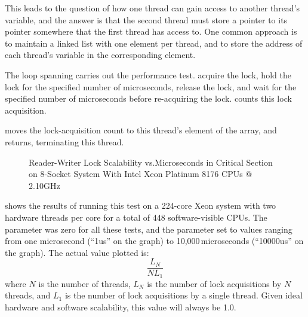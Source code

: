 {{	This leads to the question of how one thread can gain access to
	another thread's  variable, and the answer is that
	the second thread must store a pointer to its 
	pointer somewhere that the first thread has access to.
	One common approach is to maintain a linked list with one
	element per thread, and to store the address of each thread's
	 variable in the corresponding element.
}\QuickQuizEndE
}

\begin{fcvref}
The loop spanning  carries out the performance test.
 acquire the lock,
 hold the lock for the specified
number of microseconds,
 release the lock,
and  wait for the specified
number of microseconds before re-acquiring the lock.
 counts this lock acquisition.

 moves the lock-acquisition count to this thread's element of the
 array, and  returns, terminating this thread.
\end{fcvref}

\begin{figure}
\centering
{}
\caption{Reader-Writer Lock Scalability vs.\@ Microseconds in Critical Section on 8-Socket System With Intel Xeon Platinum 8176 CPUs @ 2.10GHz}
\label{fig:toolsoftrade:Reader-Writer Lock Scalability vs. Microseconds in Critical Section}
\end{figure}

shows the results of running this test on a 224-core Xeon system
with two hardware threads per core for a total of 448 software-visible
CPUs.
The  parameter was zero for all these tests, and the
 parameter set to values ranging from one microsecond (``1us''
on the graph) to 10,000\,microseconds (``10000us'' on the graph).
The actual value plotted is:
\begin{equation}
	\frac{L_N}{N L_1}
\end{equation}
where $N$ is the number of threads,
$L_N$ is the number of lock acquisitions by $N$ threads, and
$L_1$ is the number of lock acquisitions by a single thread.
Given ideal hardware and software scalability, this value will always
be 1.0.

